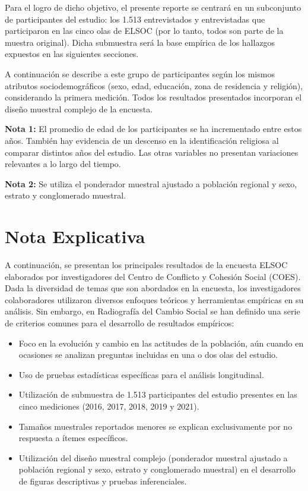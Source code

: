 \documentclass[
  12pt,
]{book}
\providecommand{\tightlist}{%
  \setlength{\itemsep}{0pt}\setlength{\parskip}{0pt}}
\begin{document}
Para el logro de dicho objetivo, el presente reporte se centrará en un subconjunto de participantes del estudio: los 1.513 entrevistados y entrevistadas que participaron en las cinco olas de ELSOC (por lo tanto, todos son parte de la muestra original). Dicha submuestra será la base empírica de los hallazgos expuestos en las siguientes secciones.

A continuación se describe a este grupo de participantes según los mismos atributos sociodemográficos (sexo, edad, educación, zona de residencia y religión), considerando la primera medición. Todos los resultados presentados incorporan el diseño muestral complejo de la encuesta.

\textbf{Nota 1:} El promedio de edad de los participantes se ha incrementado entre estos años. También hay evidencia de un descenso en la identificación religiosa al comparar distintos años del estudio. Las otras variables no presentan variaciones relevantes a lo largo del tiempo.

\textbf{Nota 2:} Se utiliza el ponderador muestral ajustado a población regional y sexo, estrato y conglomerado muestral.

\hypertarget{nota-explicativa}{%
\section{Nota Explicativa}\label{nota-explicativa}}

A continuación, se presentan los principales resultados de la encuesta ELSOC elaborados por investigadores del Centro de Conflicto y Cohesión Social (COES). Dada la diversidad de temas que son abordados en la encuesta, los investigadores colaboradores utilizaron diversos enfoques teóricos y herramientas empíricas en su análisis. Sin embargo, en Radiografía del Cambio Social se han definido una serie de criterios comunes para el desarrollo de resultados empíricos:

\begin{itemize}
\tightlist
\item
  Foco en la evolución y cambio en las actitudes de la población, aún cuando en ocasiones se analizan preguntas incluidas en una o dos olas del estudio.
\item
  Uso de pruebas estadísticas específicas para el análisis longitudinal.
\item
  Utilización de submuestra de 1.513 participantes del estudio presentes en las cinco mediciones (2016, 2017, 2018, 2019 y 2021).
\item
  Tamaños muestrales reportados menores se explican exclusivamente por no respuesta a ítemes específicos.
\item
  Utilización del diseño muestral complejo (ponderador muestral ajustado a población regional y sexo, estrato y conglomerado muestral) en el desarrollo de figuras descriptivas y pruebas inferenciales.
\end{itemize}
\end{document}
